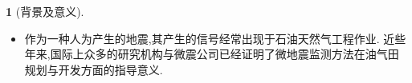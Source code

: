 \documentclass[UTF8]{ctexbeamer}	%
\theoremstyle{plain}
\theoremstyle{definition}
\newtheorem{emt}{}[section]
\theoremstyle{remark}
\numberwithin{equation}{section}
\begin{document}
\begin{frame}
    \begin{emt}[背景及意义]
      
    \begin{itemize}
\item 作为一种人为产生的地震,其产生的信号经常出现于石油天然气工程作业.
近些年来,国际上众多的研究机构与微震公司已经证明了微地震监测方法在油气田
规划与开发方面的指导意义.

    \end{itemize}

    
\end{emt}
\end{frame}
\end{document}
